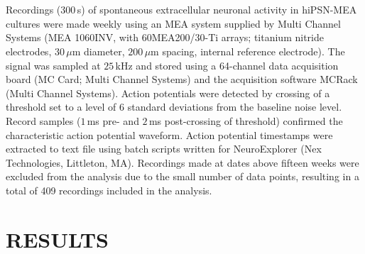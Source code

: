 \documentclass[12pt, titlepage]{article}
\begin{document}
\\ \\ Recordings ($300$\,s) of spontaneous extracellular neuronal activity in hiPSN-MEA cultures were made weekly using an MEA system supplied by Multi Channel Systems (MEA 1060INV, with 60MEA200/30-Ti arrays; titanium nitride electrodes, $30\,\mu$m diameter, $200\,\mu$m spacing, internal reference electrode). The signal was sampled at $25\,$kHz and stored using a 64-channel data acquisition board (MC Card; Multi Channel Systems) and the acquisition software MCRack (Multi Channel Systems). Action potentials were detected by crossing of a threshold set to a level of 6 standard deviations from the baseline noise level. Record samples ($1\,$ms pre- and $2\,$ms post-crossing of threshold) confirmed the characteristic action potential waveform. Action potential timestamps were extracted to text file using batch scripts written for NeuroExplorer (Nex Technologies, Littleton, MA). Recordings made at dates above fifteen weeks were excluded from the analysis due to the small number of data points, resulting in a total of 409 recordings included in the analysis.
	\section*{RESULTS}
\end{document}
